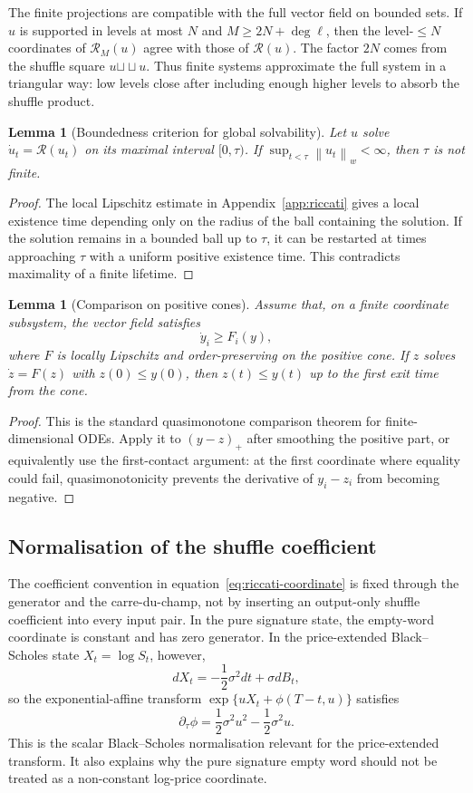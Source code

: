 \documentclass[11pt,oneside]{article}
\theoremstyle{plain}
\newtheorem{lemma}[theorem]{Lemma}
\theoremstyle{definition}
\theoremstyle{remark}
\newcommand{\Rs}{\mathcal R}
\newcommand{\sh}{\mathbin{\sqcup\!\sqcup}}
\newcommand{\norm}[1]{\left\lVert #1\right\rVert}
\begin{document}
The finite projections are compatible with the full vector field on bounded sets. If $u$ is supported in levels at most $N$ and $M\geq 2N+\deg\ell$, then the level-$\leq N$ coordinates of $\Rs_M(u)$ agree with those of $\Rs(u)$. The factor $2N$ comes from the shuffle square $u\sh u$. Thus finite systems approximate the full system in a triangular way: low levels close after including enough higher levels to absorb the shuffle product.

\begin{lemma}[Boundedness criterion for global solvability]
\label{lem:riccati-boundedness-global}
Let $u$ solve $\dot u_t=\Rs(u_t)$ on its maximal interval $[0,\tau)$. If $\sup_{t<\tau}\norm{u_t}_w<\infty$, then $\tau$ is not finite.
\end{lemma}

\begin{proof}
The local Lipschitz estimate in Appendix~\ref{app:riccati} gives a local existence time depending only on the radius of the ball containing the solution. If the solution remains in a bounded ball up to $\tau$, it can be restarted at times approaching $\tau$ with a uniform positive existence time. This contradicts maximality of a finite lifetime.
\end{proof}

\begin{lemma}[Comparison on positive cones]
\label{lem:positive-cone-comparison}
Assume that, on a finite coordinate subsystem, the vector field satisfies
\[
\dot y_i\geq F_i(y),
\]
where $F$ is locally Lipschitz and order-preserving on the positive cone. If $z$ solves $\dot z=F(z)$ with $z(0)\leq y(0)$, then $z(t)\leq y(t)$ up to the first exit time from the cone.
\end{lemma}

\begin{proof}
This is the standard quasimonotone comparison theorem for finite-dimensional ODEs. Apply it to $(y-z)_+$ after smoothing the positive part, or equivalently use the first-contact argument: at the first coordinate where equality could fail, quasimonotonicity prevents the derivative of $y_i-z_i$ from becoming negative.
\end{proof}

\subsection*{Normalisation of the shuffle coefficient}
The coefficient convention in equation~\eqref{eq:riccati-coordinate} is fixed through the generator and the carre-du-champ, not by inserting an output-only shuffle coefficient into every input pair. In the pure signature state, the empty-word coordinate is constant and has zero generator. In the price-extended Black--Scholes state $X_t=\log S_t$, however,
\[
dX_t=-\frac12\sigma^2dt+\sigma dB_t,
\]
so the exponential-affine transform $\exp\{uX_t+\phi(T-t,u)\}$ satisfies
\[
\partial_\tau\phi=\frac12\sigma^2u^2-\frac12\sigma^2u.
\]
This is the scalar Black--Scholes normalisation relevant for the price-extended transform. It also explains why the pure signature empty word should not be treated as a non-constant log-price coordinate.
\end{document}
